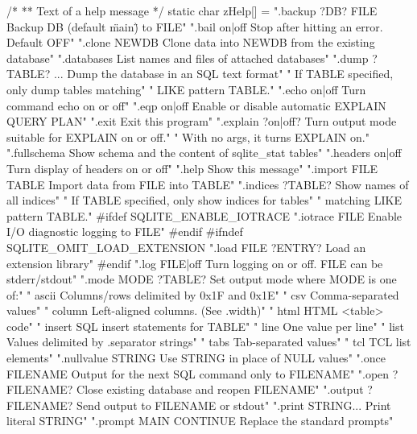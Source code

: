 \begin{Codex}[label=shell.c,numbers=left]
{/*
** Text of a help message
*/
static char zHelp[] =
  ".backup ?DB? FILE      Backup DB (default \"main\") to FILE\n"
  ".bail on|off           Stop after hitting an error.  Default OFF\n"
  ".clone NEWDB           Clone data into NEWDB from the existing database\n"
  ".databases             List names and files of attached databases\n"
  ".dump ?TABLE? ...      Dump the database in an SQL text format\n"
  "                         If TABLE specified, only dump tables matching\n"
  "                         LIKE pattern TABLE.\n"
  ".echo on|off           Turn command echo on or off\n"
  ".eqp on|off            Enable or disable automatic EXPLAIN QUERY PLAN\n"
  ".exit                  Exit this program\n"
  ".explain ?on|off?      Turn output mode suitable for EXPLAIN on or off.\n"
  "                         With no args, it turns EXPLAIN on.\n"
  ".fullschema            Show schema and the content of sqlite_stat tables\n"
  ".headers on|off        Turn display of headers on or off\n"
  ".help                  Show this message\n"
  ".import FILE TABLE     Import data from FILE into TABLE\n"
  ".indices ?TABLE?       Show names of all indices\n"
  "                         If TABLE specified, only show indices for tables\n"
  "                         matching LIKE pattern TABLE.\n"
#ifdef SQLITE_ENABLE_IOTRACE
  ".iotrace FILE          Enable I/O diagnostic logging to FILE\n"
#endif
#ifndef SQLITE_OMIT_LOAD_EXTENSION
  ".load FILE ?ENTRY?     Load an extension library\n"
#endif
  ".log FILE|off          Turn logging on or off.  FILE can be stderr/stdout\n"
  ".mode MODE ?TABLE?     Set output mode where MODE is one of:\n"
  "                         ascii    Columns/rows delimited by 0x1F and 0x1E\n"
  "                         csv      Comma-separated values\n"
  "                         column   Left-aligned columns.  (See .width)\n"
  "                         html     HTML <table> code\n"
  "                         insert   SQL insert statements for TABLE\n"
  "                         line     One value per line\n"
  "                         list     Values delimited by .separator strings\n"
  "                         tabs     Tab-separated values\n"
  "                         tcl      TCL list elements\n"
  ".nullvalue STRING      Use STRING in place of NULL values\n"
  ".once FILENAME         Output for the next SQL command only to FILENAME\n"
  ".open ?FILENAME?       Close existing database and reopen FILENAME\n"
  ".output ?FILENAME?     Send output to FILENAME or stdout\n"
  ".print STRING...       Print literal STRING\n"
  ".prompt MAIN CONTINUE  Replace the standard prompts\n"
}
\end{Codex}
